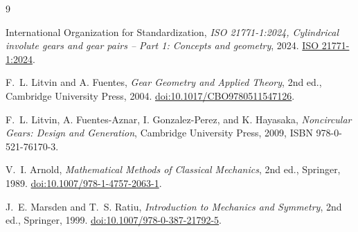 \documentclass[11pt,a4paper]{article}
\theoremstyle{definition}
\theoremstyle{plain}
\theoremstyle{remark}
\begin{document}
\begingroup
\small
{}
\begin{thebibliography}{9}

International Organization for Standardization,
\emph{ISO 21771-1:2024, Cylindrical involute gears and gear pairs --
Part 1: Concepts and geometry}, 2024.
\href{https://www.iso.org/standard/84949.html}
{ISO 21771-1:2024}.

F.~L. Litvin and A. Fuentes,
\emph{Gear Geometry and Applied Theory}, 2nd ed.,
Cambridge University Press, 2004.
\href{https://doi.org/10.1017/CBO9780511547126}
{doi:10.1017/CBO9780511547126}.

F.~L. Litvin, A. Fuentes-Aznar, I. Gonzalez-Perez, and K. Hayasaka,
\emph{Noncircular Gears: Design and Generation},
Cambridge University Press, 2009, ISBN 978-0-521-76170-3.

V.~I. Arnold, \emph{Mathematical Methods of Classical Mechanics},
2nd ed., Springer, 1989.
\href{https://doi.org/10.1007/978-1-4757-2063-1}
{doi:10.1007/978-1-4757-2063-1}.

J.~E. Marsden and T.~S. Ratiu,
\emph{Introduction to Mechanics and Symmetry}, 2nd ed.,
Springer, 1999.
\href{https://doi.org/10.1007/978-0-387-21792-5}
{doi:10.1007/978-0-387-21792-5}.

\end{thebibliography}
\endgroup
\end{document}
